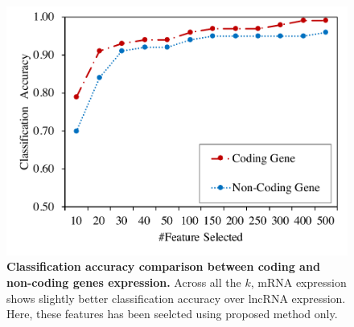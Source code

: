 \documentclass{bioinfo}
\begin{document}
{\begin{figure}[h!]
    \centering
    \includegraphics[scale=0.45]{fig/acc-mRNA-lncRNA.pdf}
    \caption{\textbf{Classification accuracy comparison between coding and non-coding genes expression.} Across all the $k$, mRNA expression shows slightly better classification accuracy over lncRNA expression. Here, these features has been seelcted using proposed method only.}
    \label{fig:acc-mRNA-lncRNA}
\end{figure}
}
\end{document}
